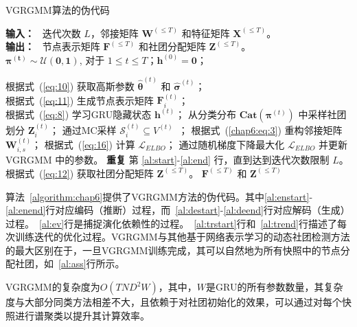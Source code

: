 \begin{algorithm}[h]
	\caption{VGRGMM算法的伪代码} %
	\begin{algorithmic}[1]
		\STATE \textbf{输入：} ~迭代次数 $L$，邻接矩阵 $\mathbf{W}^{(\le T)}$ 和特征矩阵 $\mathbf{X}^{(\le T)}$。\\
		\STATE \textbf{输出：} ~节点表示矩阵 $\mathbf{F}^{(\le T)}$ 和社团分配矩阵 $\mathbf{Z}^{(\le T)}$。 \\
		 $\bm{\pi^{(t)}} \sim \bm{\mathcal{U}(0,1)}$, 对于 $1 \le t \le T$；$ \mathbf{h}^{(0)}=\mathbf{0}$；
		 \label{al:start}
		
		\STATE 根据式~(\ref{eq:10}) 获取高斯参数 $\hat{\mathbf{\theta}}^{(t)}$ 和 $\hat{\mathbf{\sigma}}^{(t)}$； \label{al:enstart} \\
		\STATE 根据式~(\ref{eq:11}) 生成节点表示矩阵 $\mathbf{F}_i^{(t)}$； \label{al:enend} \\
		\STATE 根据式~(\ref{eq:8}) 学习GRU隐藏状态 $\mathbf{h}^{(t)}$； \label{al:ev}
		   \label{al:destart}
		\STATE 从分类分布 $\boldsymbol{Cat}(\bm{\pi}^{(t)})$ 中采样社团划分 $\mathbf{Z}_i^{(t)}$；
		\STATE 通过MC采样 $\mathcal{S}_i^{(t)} \subseteq V^{(t)}$~\cite{kingma2013auto}；
		\STATE 根据式~(\ref{chap6:eq:3}) 重构邻接矩阵 $\mathbf{W}_{i,s}^{(t)}$；
		\ENDFOR
		\ENDFOR 
		\ENDFOR \label{al:deend}
		\STATE 根据式~(\ref{eq:16}) 计算 $\mathcal{L}_{ELBO}$； \label{al:trstart}
		\STATE 通过随机梯度下降最大化 $\mathcal{L}_{ELBO}$ 并更新 VGRGMM 中的参数。\label{al:end} \label{al:trend}
		\STATE \textbf{重复} 第 \ref{al:start}-\ref{al:end} 行，直到达到迭代次数限制 $L$。
		\STATE 根据式~(\ref{eq:12}) 获取社团分配矩阵 $\mathbf{Z}^{(\le T)}$。 \label{al:ass}
		\RETURN $\mathbf{F}^{(\le T)}$ 和 $\mathbf{Z}^{(\le T)}$
		
	\end{algorithmic}
	\label{algorithm:chap6}
\end{algorithm}
算法~\ref{algorithm:chap6}提供了VGRGMM方法的伪代码。其中\ref{al:enstart}-\ref{al:enend}行对应编码（推断）过程，而~\ref{al:destart}-\ref{al:deend}行对应解码（生成）过程。~\ref{al:ev}行是捕捉演化依赖性的过程。~\ref{al:trstart}行和~\ref{al:trend}行描述了每次训练迭代的优化过程。VGRGMM与其他基于网络表示学习的动态社团检测方法的最大区别在于，一旦VGRGMM训练完成，其可以自然地为所有快照中的节点分配社团，如~\ref{al:ass}行所示。




VGRGMM的复杂度为$O(TND^2W)$，其中，$W$是GRU的所有参数数量，其复杂度与大部分同类方法相差不大，且依赖于对社团初始化的效果，可以通过对每个快照进行谱聚类以提升其计算效率。

